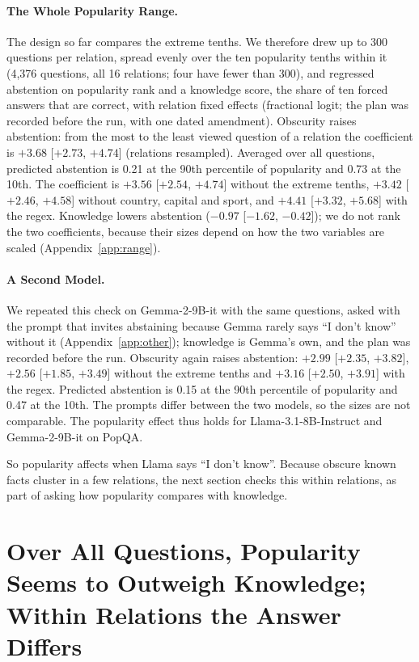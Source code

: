\documentclass[letterpaper]{article} %
\newcommand{\idk}{``I don't know''}
\begin{document}
\paragraph{The Whole Popularity Range.}
The design so far compares the extreme tenths. We therefore drew up to 300 questions per relation, spread evenly over the ten popularity tenths within it (4,376 questions, all 16 relations; four have fewer than 300), and regressed abstention on popularity rank and a knowledge score, the share of ten forced answers that are correct, with relation fixed effects (fractional logit; the plan was recorded before the run, with one dated amendment). Obscurity raises abstention: from the most to the least viewed question of a relation the coefficient is $+3.68$ [$+2.73$, $+4.74$] (relations resampled). Averaged over all questions, predicted abstention is 0.21 at the 90th percentile of popularity and 0.73 at the 10th. The coefficient is $+3.56$ [$+2.54$, $+4.74$] without the extreme tenths, $+3.42$ [$+2.46$, $+4.58$] without country, capital and sport, and $+4.41$ [$+3.32$, $+5.68$] with the regex. Knowledge lowers abstention ($-0.97$ [$-1.62$, $-0.42$]); we do not rank the two coefficients, because their sizes depend on how the two variables are scaled (Appendix~\ref{app:range}).

\paragraph{A Second Model.}
We repeated this check on Gemma-2-9B-it with the same questions, asked with the prompt that invites abstaining because Gemma rarely says \idk{} without it (Appendix~\ref{app:other}); knowledge is Gemma's own, and the plan was recorded before the run. Obscurity again raises abstention: $+2.99$ [$+2.35$, $+3.82$], $+2.56$ [$+1.85$, $+3.49$] without the extreme tenths and $+3.16$ [$+2.50$, $+3.91$] with the regex. Predicted abstention is 0.15 at the 90th percentile of popularity and 0.47 at the 10th. The prompts differ between the two models, so the sizes are not comparable. The popularity effect thus holds for Llama-3.1-8B-Instruct and Gemma-2-9B-it on PopQA.

So popularity affects when Llama says \idk. Because obscure known facts cluster in a few relations, the next section checks this within relations, as part of asking how popularity compares with knowledge.

\section{Over All Questions, Popularity Seems to Outweigh Knowledge; Within Relations the Answer Differs}
\label{sec:margin}
\end{document}
